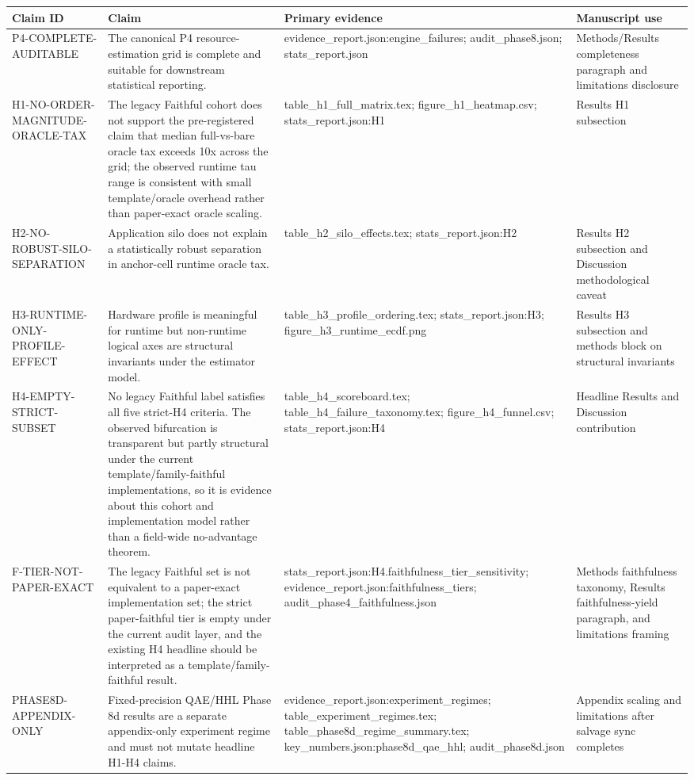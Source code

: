 \begin{tabular}{llll}
\toprule
Claim ID & Claim & Primary evidence & Manuscript use \\
\midrule
P4-COMPLETE-AUDITABLE & The canonical P4 resource-estimation grid is complete and suitable for downstream statistical reporting. & evidence\_report.json:engine\_failures; audit\_phase8.json; stats\_report.json & Methods/Results completeness paragraph and limitations disclosure \\
H1-NO-ORDER-MAGNITUDE-ORACLE-TAX & The legacy Faithful cohort does not support the pre-registered claim that median full-vs-bare oracle tax exceeds 10x across the grid; the observed runtime tau range is consistent with small template/oracle overhead rather than paper-exact oracle scaling. & table\_h1\_full\_matrix.tex; figure\_h1\_heatmap.csv; stats\_report.json:H1 & Results H1 subsection \\
H2-NO-ROBUST-SILO-SEPARATION & Application silo does not explain a statistically robust separation in anchor-cell runtime oracle tax. & table\_h2\_silo\_effects.tex; stats\_report.json:H2 & Results H2 subsection and Discussion methodological caveat \\
H3-RUNTIME-ONLY-PROFILE-EFFECT & Hardware profile is meaningful for runtime but non-runtime logical axes are structural invariants under the estimator model. & table\_h3\_profile\_ordering.tex; stats\_report.json:H3; figure\_h3\_runtime\_ecdf.png & Results H3 subsection and methods block on structural invariants \\
H4-EMPTY-STRICT-SUBSET & No legacy Faithful label satisfies all five strict-H4 criteria. The observed bifurcation is transparent but partly structural under the current template/family-faithful implementations, so it is evidence about this cohort and implementation model rather than a field-wide no-advantage theorem. & table\_h4\_scoreboard.tex; table\_h4\_failure\_taxonomy.tex; figure\_h4\_funnel.csv; stats\_report.json:H4 & Headline Results and Discussion contribution \\
F-TIER-NOT-PAPER-EXACT & The legacy Faithful set is not equivalent to a paper-exact implementation set; the strict paper-faithful tier is empty under the current audit layer, and the existing H4 headline should be interpreted as a template/family-faithful result. & stats\_report.json:H4.faithfulness\_tier\_sensitivity; evidence\_report.json:faithfulness\_tiers; audit\_phase4\_faithfulness.json & Methods faithfulness taxonomy, Results faithfulness-yield paragraph, and limitations framing \\
PHASE8D-APPENDIX-ONLY & Fixed-precision QAE/HHL Phase 8d results are a separate appendix-only experiment regime and must not mutate headline H1-H4 claims. & evidence\_report.json:experiment\_regimes; table\_experiment\_regimes.tex; table\_phase8d\_regime\_summary.tex; key\_numbers.json:phase8d\_qae\_hhl; audit\_phase8d.json & Appendix scaling and limitations after salvage sync completes \\
\bottomrule
\end{tabular}
